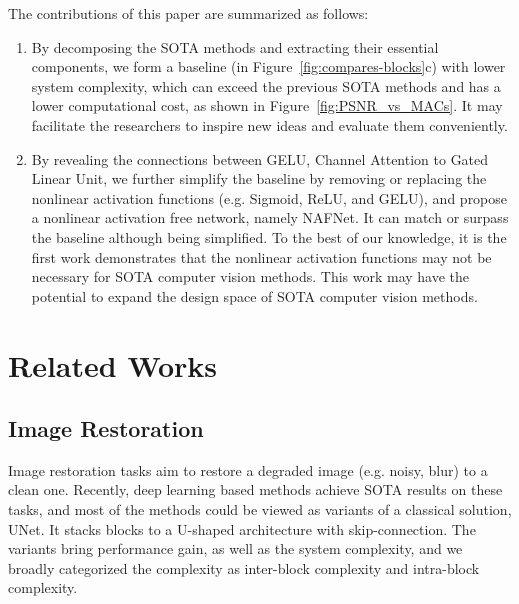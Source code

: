 \documentclass[runningheads]{llncs}
\begin{document}
The contributions of this paper are summarized as follows:
 \begin{enumerate}
\item By decomposing the SOTA methods and extracting their essential components, we form a baseline (in Figure~\ref{fig:compares-blocks}c) with lower system complexity, which can exceed the previous SOTA methods and has a lower computational cost, as shown in Figure~\ref{fig:PSNR_vs_MACs}. 
It may facilitate the researchers to inspire new ideas and evaluate them conveniently. 
 \item By revealing the connections between GELU, Channel Attention to Gated Linear Unit, we further simplify the baseline  by removing or replacing the nonlinear activation functions (e.g. Sigmoid, ReLU, and GELU), and propose a nonlinear activation free network, namely NAFNet. It can match or surpass the baseline although being simplified. To the best of our knowledge, it is the first work demonstrates that the nonlinear activation functions may not be necessary for SOTA computer vision methods. This work may have the potential to expand the design space of SOTA computer vision methods.

\end{enumerate}









\section{Related Works}

\subsection{Image Restoration}
Image restoration tasks aim to restore a degraded image (e.g. noisy, blur) to a clean one. 
Recently, deep learning based methods\cite{chen2021hinet,waqas2021multi,zamir2021restormer,wang2021uformer,cheng2021nbnet,cho2021rethinking,tu2022maxim,chu2021revisiting,mao2021deep} achieve SOTA results on these tasks, and most of the methods could be viewed as variants of a classical solution, UNet\cite{ronneberger2015u}. It stacks blocks to a U-shaped architecture with skip-connection. 
The variants bring performance gain, as well as the system complexity, and we broadly categorized the complexity as inter-block complexity and intra-block complexity.
\end{document}
